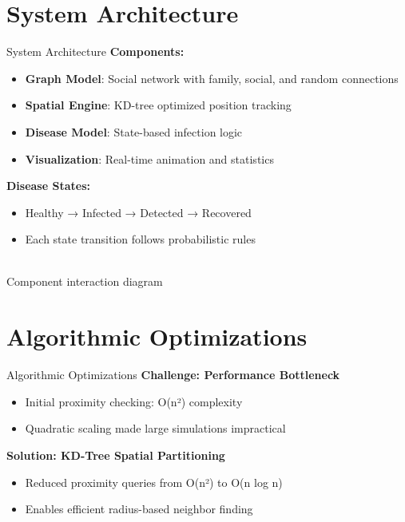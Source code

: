 \documentclass{beamer}
\begin{document}
\section{System Architecture}
\begin{frame}{System Architecture}
\textbf{Components:}
\begin{itemize}
    \item \textbf{Graph Model}: Social network with family, social, and random connections
    \item \textbf{Spatial Engine}: KD-tree optimized position tracking 
    \item \textbf{Disease Model}: State-based infection logic
    \item \textbf{Visualization}: Real-time animation and statistics
\end{itemize}

\vspace{0.3cm}
\textbf{Disease States:}
\begin{itemize}
    \item Healthy → Infected → Detected → Recovered
    \item Each state transition follows probabilistic rules
\end{itemize}

\vspace{0.3cm}
\begin{center}
    \\
    \small{Component interaction diagram}
\end{center}
\end{frame}

\section{Algorithmic Optimizations}
\begin{frame}{Algorithmic Optimizations}
\textbf{Challenge: Performance Bottleneck}
\begin{itemize}
    \item Initial proximity checking: O(n²) complexity
    \item Quadratic scaling made large simulations impractical
\end{itemize}

\vspace{0.3cm}
\textbf{Solution: KD-Tree Spatial Partitioning}
\begin{itemize}
    \item Reduced proximity queries from O(n²) to O(n log n)
    \item Enables efficient radius-based neighbor finding
\end{itemize}
\end{frame}
\end{document}
